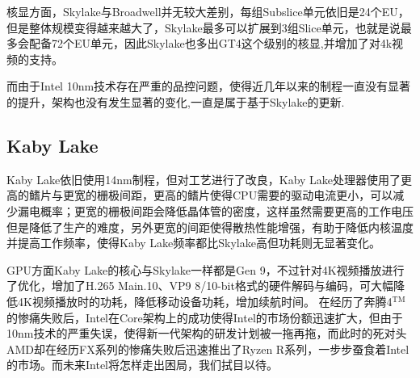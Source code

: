 \documentclass[UTF8]{pkuthss}
\begin{document}
	核显方面，Skylake与Broadwell并无较大差别，每组Subslice单元依旧是24个EU，但是整体规模变得越来越大了，Skylake最多可以扩展到3组Slice单元，也就是说最多会配备72个EU单元，因此Skylake也多出GT4这个级别的核显,并增加了对4k视频的支持。
	
	而由于Intel 10nm技术存在严重的品控问题，使得近几年以来的制程一直没有显著的提升，架构也没有发生显著的变化,一直是属于基于Skylake的更新.
	\subsection{Kaby Lake}
	
	Kaby Lake依旧使用14nm制程，但对工艺进行了改良，Kaby Lake处理器使用了更高的鳍片与更宽的栅极间距，更高的鳍片使得CPU需要的驱动电流更小，可以减少漏电概率；更宽的栅极间距会降低晶体管的密度，这样虽然需要更高的工作电压但是降低了生产的难度，另外更宽的间距使得散热性能增强，有助于降低内核温度并提高工作频率，使得Kaby Lake频率都比Skylake高但功耗则无显著变化。
	
	GPU方面Kaby Lake的核心与Skylake一样都是Gen 9，不过针对4K视频播放进行了优化，增加了H.265 Main.10、VP9 8/10-bit格式的硬件解码与编码，可大幅降低4K视频播放时的功耗，降低移动设备功耗，增加续航时间。
在经历了奔腾4$^\text{TM}$的惨痛失败后，Intel在Core架构上的成功使得Intel的市场份额迅速扩大，但由于10nm技术的严重失误，使得新一代架构的研发计划被一拖再拖，而此时的死对头AMD却在经历FX系列的惨痛失败后迅速推出了Ryzen R系列，一步步蚕食着Intel的市场。而未来Intel将怎样走出困局，我们拭目以待。
	\appendix
	\printbibliography[heading = bibintoc]
\end{document}
